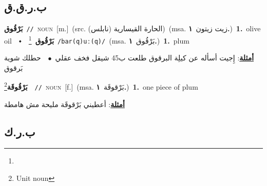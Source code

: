 \documentclass[10pt,a4paper,twoside]{article} %
\begin{document}
\begin{multicols}{2}
\vspace{-3mm}
\subsection*{\color{blue}\foreignlanguage{arabic}{ب.ر.ق.ق}\color{blue}{}} 

{\setlength\topsep{0pt}\textbf{\foreignlanguage{arabic}{بَرْقُوق}}\ {\color{gray}\texttt{//}\color{black}}\ \textsc{noun}\ [m.]\ (src. \color{gray}\foreignlanguage{arabic}{الحارة القيسارية (نابلس)}\color{black})\ \color{gray}(msa. \foreignlanguage{arabic}{زيت زيتون}~\foreignlanguage{arabic}{\textbf{١.}})\color{black}\ \textbf{1.}~olive oil\ \ $\smblkdiamond$\ \ \setlength\topsep{0pt}\textbf{\foreignlanguage{arabic}{بَرْقُوق}}\ \footnote{}\ {\color{gray}\texttt{/bar(q)uː(q)/}\color{black}}\ \color{gray}(msa. \foreignlanguage{arabic}{بَرْقُوق}~\foreignlanguage{arabic}{\textbf{١.}})\color{black}\ \textbf{1.}~plum\  \begin{flushright}\color{gray}\foreignlanguage{arabic}{\textbf{\underline{\foreignlanguage{arabic}{أمثلة}}}: إِجيت أسأله عن كيلِة البرقوق طلعت ب45 شيقل فخف عقلي\ $\bullet$\ \  حطلك شوية بَرقوق}\end{flushright}\color{black}} \vspace{2mm}

{\setlength\topsep{0pt}\textbf{\foreignlanguage{arabic}{بَرْقُوقَة}}\footnote{Unit noun}\ \ {\color{gray}\texttt{//}\color{black}}\ \textsc{noun}\ [f.]\ \color{gray}(msa. \foreignlanguage{arabic}{بَرْقوقَة}~\foreignlanguage{arabic}{\textbf{١.}})\color{black}\ \textbf{1.}~one piece of plum\  \begin{flushright}\color{gray}\foreignlanguage{arabic}{\textbf{\underline{\foreignlanguage{arabic}{أمثلة}}}: أعطيني بَرْقوقَة مليحة مش هامطة}\end{flushright}\color{black}} \vspace{2mm}

\vspace{-3mm}
\subsection*{\color{blue}\foreignlanguage{arabic}{ب.ر.ك}\color{blue}{}} 


\end{multicols}
\end{document}
